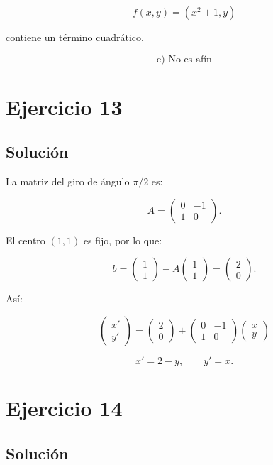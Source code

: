 \documentclass[11pt,a4paper]{article}
\begin{document}
\[
f(x,y)=(x^2+1,y)
\]

contiene un término cuadrático.

\[
\boxed{\text{e) No es afín}}
\]

\section{Ejercicio 13}
\subsection{Solución}

La matriz del giro de ángulo $\pi/2$ es:

\[
A=
\begin{pmatrix}
0&-1\\
1&0
\end{pmatrix}.
\]

El centro $(1,1)$ es fijo, por lo que:

\[
b=
\begin{pmatrix}
1\\1
\end{pmatrix}
-
A
\begin{pmatrix}
1\\1
\end{pmatrix}
=
\begin{pmatrix}
2\\0
\end{pmatrix}.
\]

Así:

\[
\boxed{
\begin{pmatrix}
x'\\y'
\end{pmatrix}
=
\begin{pmatrix}
2\\0
\end{pmatrix}
+
\begin{pmatrix}
0&-1\\
1&0
\end{pmatrix}
\begin{pmatrix}
x\\y
\end{pmatrix}
}
\]

\[
\boxed{
x'=2-y,
\qquad
y'=x.
}
\]

\section{Ejercicio 14}
\subsection{Solución}
\end{document}
